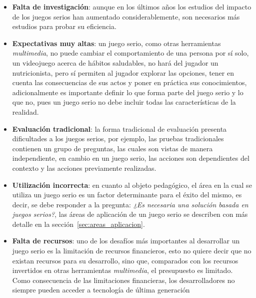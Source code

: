 \begin{itemize}

\item \textbf{Falta de investigación}: aunque en los últimos años los estudios
    del impacto de los juegos serios han aumentado considerablemente, son
    necesarios más estudios para probar su eficiencia\cite{sg:aoverview}.
    

\item \textbf{Expectativas muy altas}: un juego serio, como otras herramientas 
    \textit{multimedia}, no puede cambiar el comportamiento de una persona por sí
    solo, un videojuego acerca de hábitos saludables, no hará del jugador un
    nutricionista, pero sí permiten al jugador explorar las opciones, tener en
    cuenta las consecuencias de sus actos y poner en práctica sus
    conocimientos\cite{education:games}, adicionalmente es importante definir lo
    que forma parte del juego serio y lo que no, pues un juego serio no debe
    incluir todas las características de la
    realidad\cite{stapleton2004serious,videojuegos:gonzaleztardon}. 

\item \textbf{Evaluación tradicional}: la forma tradicional de evaluación presenta
    dificultades a los juegos serios, por ejemplo, las pruebas tradicionales
    contienen un grupo de preguntas, las cuales son vistas de manera
    independiente, en cambio en un juego serio, las acciones son dependientes
    del contexto y las acciones previamente realizadas\cite{shute2009melding}.

\item \textbf{Utilización incorrecta}: en cuanto al objeto pedagógico, el área
    en la cual se utiliza un juego serio es un factor determinante para el éxito
    del mismo, es decir, se debe responder a la pregunta: \emph{¿Es necesaria
        una solución basada en juegos serios?}\cite{stapleton2004serious}, las
    áreas de aplicación de un juego serio se describen con más detalle en la
    sección~\ref{sec:areas_aplicacion}.

\item \textbf{Falta de recursos}: uno de los desafíos más importantes al
    desarrollar un juego serio es la limitación de recursos financieros, esto no
    quiere decir que no existan recursos para su desarrollo, sino que,
    comparados con los recursos invertidos en otras herramientas
    \textit{multimedia}, el presupuesto es
    limitado\cite{stapleton2004serious,sg:aoverview}. Como consecuencia de las
    limitaciones financieras, los desarrolladores no siempre pueden acceder a
    tecnología de última generación\cite{stapleton2004serious}


\end{itemize}

